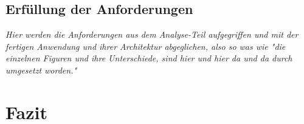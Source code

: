 \subsection{Erfüllung der Anforderungen}
\label{subsec:erfullung_anforderungen}

\emph{Hier werden die Anforderungen aus dem Analyse-Teil aufgegriffen und mit der fertigen Anwendung und ihrer Architektur abgeglichen, also so was wie "die einzelnen Figuren und ihre Unterschiede, sind hier und hier da und da durch umgesetzt worden."}

\section{Fazit}
\label{sec:Fazit}